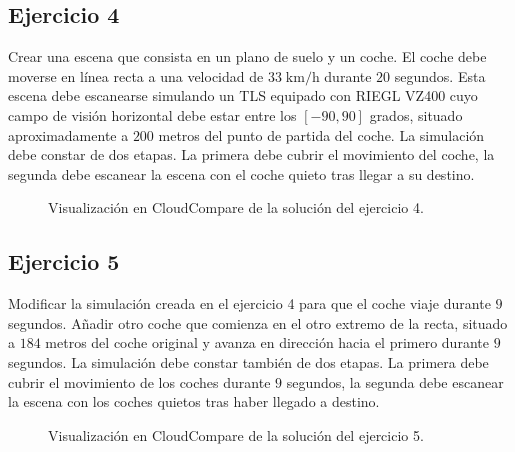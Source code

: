 \documentclass[]{article}
\begin{document}
	\pagebreak
	

	\subsection*{Ejercicio 4}
	Crear una escena que consista en un plano de suelo y un coche. El coche debe moverse en línea recta a una velocidad de $33 \;\mathrm{km}/\mathrm{h}$ durante $20$ segundos. Esta escena debe escanearse simulando un TLS equipado con RIEGL VZ400 cuyo campo de visión horizontal debe estar entre los $[-90, 90]$ grados, situado aproximadamente a $200$ metros del punto de partida del coche. La simulación debe constar de dos etapas. La primera debe cubrir el movimiento del coche, la segunda debe escanear la escena con el coche quieto tras llegar a su destino.

	\begin{figure}[htb]
		\centering
		\caption{Visualización en CloudCompare de la solución del ejercicio 4.}
		\label{fig:ejercicio4}
	\end{figure} 
	
	\pagebreak
	
	
	\subsection*{Ejercicio 5}
	Modificar la simulación creada en el ejercicio 4 para que el coche viaje durante $9$ segundos. Añadir otro coche que comienza en el otro extremo de la recta, situado a $184$ metros del coche original y avanza en dirección hacia el primero durante $9$ segundos. La simulación debe constar también de dos etapas. La primera debe cubrir el movimiento de los coches durante $9$ segundos, la segunda debe escanear la escena con los coches quietos tras haber llegado a destino.
	
	\begin{figure}[htb]
		\centering
		\caption{Visualización en CloudCompare de la solución del ejercicio 5.}
		\label{fig:ejercicio5}
	\end{figure} 


	
\end{document}
